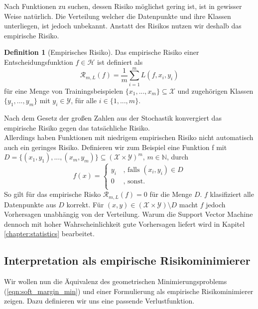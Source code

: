 \documentclass{article}
\theoremstyle{plain}
\theoremstyle{definition}
\newtheorem{dfn}[thm]{Definition}
\begin{document}
    Nach Funktionen zu suchen, dessen Risiko möglichst gering ist, ist in gewisser Weise natürlich.
    Die Verteilung welcher die Datenpunkte und ihre Klassen unterliegen, ist jedoch unbekannt. Anstatt des Risikos nutzen wir deshalb das empirische Risiko.

    \begin{dfn}[Empirisches Risiko]
        Das empirische Risiko einer Entscheidungsfunktion $f \in \mathcal{H}$ ist definiert als
        \begin{equation*}
            \mathcal{R}_{m,L}(f) = \frac{1}{m} \sum_{i=1}^{m}L(f,x_{i},y_{i})
        \end{equation*}
        für eine Menge von Trainingsbeispielen $\{x_1, ..., x_m\} \subseteq \mathcal{X}$ und zugehörigen Klassen $\{y_1, ..., y_m\}$ mit $y_i \in \mathcal{Y}$, für alle $i \in \{1, ..., m\}$.
    \end{dfn}
    
    Nach dem Gesetz der großen Zahlen aus der Stochastik konvergiert das empirische Risiko gegen das tatsächliche Risiko. \\
    Allerdings haben Funktionen mit niedrigem empirischen Risiko nicht automatisch auch ein geringes Risiko. Definieren wir zum Beispiel eine Funktion f mit $D = \{(x_{1},y_{1}),...,(x_{m},y_{m})\} \subseteq (\mathcal{X} \times \mathcal{Y})^{m}$, $m \in \mathbb{N}$, durch
    \[
        f(x) = \left\{
        \begin{array}{ll}
             y_{i} & \, \textrm{, falls } (x_{i}, y_{i}) \in D \\
             0 & \, \textrm{, sonst.}\\
         \end{array}
        \right.
    \]
    So gilt für das empirische Risko $\mathcal{R}_{m, L}(f) = 0$ für die Menge $D$. $f$ klasifiziert alle Datenpunkte aus $D$ korrekt.
    Für $(x,y) \in (\mathcal{X} \times \mathcal{Y}) \setminus D $ macht $f$ jedoch Vorhersagen unabhängig von der Verteilung.
    Warum die Support Vector Machine dennoch mit hoher Wahrscheinlichkeit gute Vorhersagen liefert wird in Kapitel \ref{chapter:statistics} bearbeitet.
    
    \subsection{Interpretation als empirische Risikominimierer}
    Wir wollen nun die Äquivalenz des geometrischen Minimierungsproblems (\ref{eqn:soft_margin_min}) und einer Formulierung als empirische Risikominimierer zeigen. Dazu definieren wir uns eine passende Verlustfunktion.
    
\end{document}
